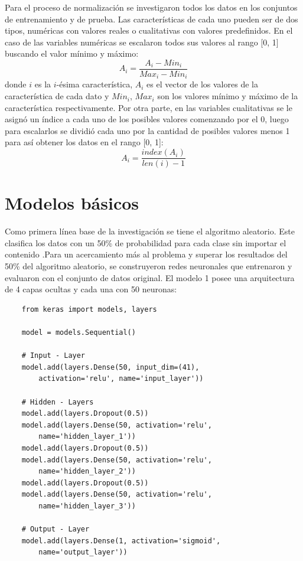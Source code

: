 Para el proceso de normalización se investigaron todos los datos en los conjuntos de entrenamiento y de prueba. Las características de cada uno pueden ser de dos tipos, numéricas con valores reales o cualitativas con valores predefinidos. En el caso de las variables numéricas se escalaron todos sus valores al rango [0, 1] buscando el valor mínimo y máximo:
\[A_{i} = \frac{A_{i} - Min_{i}}{Max_{i} - Min_{i}}\] 
donde $i$ es la $i$-\'esima característica, $A_{i}$ es el vector de los valores de la característica de cada dato y $Min_{i}$, $Max_{i}$ son los valores mínimo y máximo de la característica respectivamente. Por otra parte, en las variables cualitativas se le asignó un índice a cada uno de los posibles valores comenzando por el 0, luego para escalarlos se dividió cada uno por la cantidad de posibles valores menos 1 para así obtener los datos en el rango [0, 1]:
\[A_{i} = \frac{index(A_{i})}{len(i) - 1}\]

\section{Modelos básicos}
Como primera línea base de la investigación se tiene el algoritmo aleatorio. Este clasifica los datos con un 50\% de probabilidad para cada clase sin importar el contenido .Para un acercamiento más al problema y superar los resultados del 50\% del algoritmo aleatorio, se construyeron redes neuronales que entrenaron y evaluaron con el conjunto de datos original. El modelo 1 posee una arquitectura de 4 capas ocultas y cada una con 50 neuronas:
\begin{verbatim}
    from keras import models, layers

    model = models.Sequential()

    # Input - Layer
    model.add(layers.Dense(50, input_dim=(41), 
        activation='relu', name='input_layer'))

    # Hidden - Layers
    model.add(layers.Dropout(0.5))
    model.add(layers.Dense(50, activation='relu', 
        name='hidden_layer_1'))
    model.add(layers.Dropout(0.5))
    model.add(layers.Dense(50, activation='relu', 
        name='hidden_layer_2'))
    model.add(layers.Dropout(0.5))
    model.add(layers.Dense(50, activation='relu', 
        name='hidden_layer_3'))

    # Output - Layer
    model.add(layers.Dense(1, activation='sigmoid', 
        name='output_layer'))
\end{verbatim}

